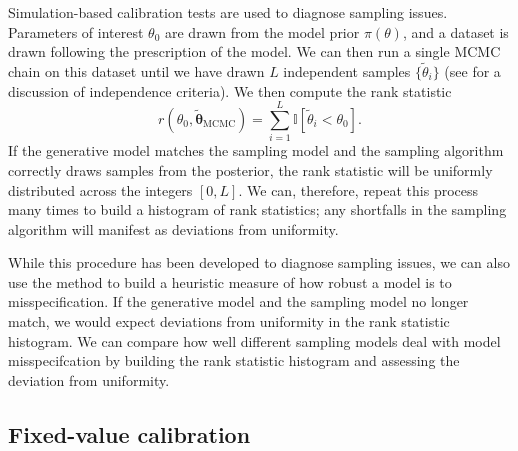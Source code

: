 \documentclass[fleqn,usenatbib]{mnras}
\begin{document}
Simulation-based calibration tests \citep{Cook:2006, Talts:2018} are used to
diagnose sampling issues. Parameters of interest $\theta_0$ are drawn from the
model prior $\pi(\theta)$, and a dataset is drawn following the prescription of
the model. We can then run a single MCMC chain on this dataset until we have
drawn $L$ independent samples $\{\tilde{\theta}_{i}\}$ (see \citep{Talts:2018}
for a discussion of independence criteria). We then compute the rank statistic
\begin{equation}
    r(\theta_0, \tilde{\boldsymbol{\theta}}_{\text{MCMC}})
        = \sum_{i = 1}^{L} \mathbb I [\tilde{\theta}_i < \theta_0].
\end{equation}
If the generative model matches the sampling model and the sampling algorithm
correctly draws samples from the posterior, the rank statistic will be uniformly
distributed across the integers $[0, L]$. We can, therefore, repeat this process
many times to build a histogram of rank statistics; any shortfalls in the
sampling algorithm will manifest as deviations from uniformity.

While this procedure has been developed to diagnose sampling issues, we can also
use the method to build a heuristic measure of how robust a model is to
misspecification. If the generative model and the sampling model no longer
match, we would expect deviations from uniformity in the rank statistic
histogram. We can compare how well different sampling models deal with model
misspecifcation by building the rank statistic histogram and assessing the
deviation from uniformity.

\subsection{Fixed-value calibration}
\label{sec:methods.fixed}



\end{document}
